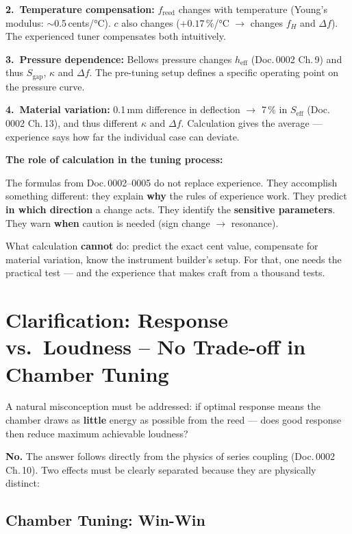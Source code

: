 \documentclass[11pt,a4paper]{article}
\begin{document}
\textbf{2.\ Temperature compensation:} $f_\text{reed}$ changes with temperature (Young's modulus: $\sim$0.5\,cents/°C). $c$ also changes ($+0{.}17\,\%$/°C $\to$ changes $f_H$ and $\Delta f$). The experienced tuner compensates both intuitively.

\textbf{3.\ Pressure dependence:} Bellows pressure changes $h_\text{eff}$ (Doc.\,0002 Ch.\,9) and thus $S_\text{gap}$, $\kappa$ and $\Delta f$. The pre-tuning setup defines a specific operating point on the pressure curve.

\textbf{4.\ Material variation:} 0.1\,mm difference in deflection $\to$ 7\,\% in $S_\text{eff}$ (Doc.\,0002 Ch.\,13), and thus different $\kappa$ and $\Delta f$. Calculation gives the average --- experience says how far the individual case can deviate.

\begin{keybox}
\textbf{The role of calculation in the tuning process:}

The formulas from Doc.\,0002--0005 do not replace experience. They accomplish something different: they explain \textbf{why} the rules of experience work. They predict \textbf{in which direction} a change acts. They identify the \textbf{sensitive parameters}. They warn \textbf{when} caution is needed (sign change $\to$ resonance).

What calculation \textbf{cannot} do: predict the exact cent value, compensate for material variation, know the instrument builder's setup. For that, one needs the practical test --- and the experience that makes craft from a thousand tests.
\end{keybox}

\section{Clarification: Response vs.\ Loudness -- No Trade-off in Chamber Tuning}

A natural misconception must be addressed: if optimal response means the chamber draws as \textbf{little} energy as possible from the reed --- does good response then reduce maximum achievable loudness?

\textbf{No.} The answer follows directly from the physics of series coupling (Doc.\,0002 Ch.\,10). Two effects must be clearly separated because they are physically distinct:

\subsection{Chamber Tuning: Win-Win}
\end{document}
